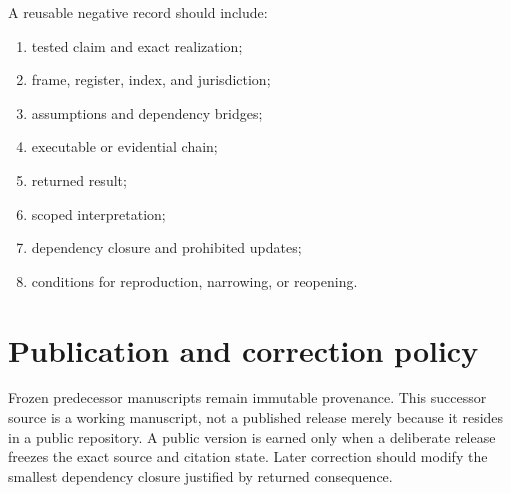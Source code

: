 A reusable negative record should include:
\begin{enumerate}
\item tested claim and exact realization;
\item frame, register, index, and jurisdiction;
\item assumptions and dependency bridges;
\item executable or evidential chain;
\item returned result;
\item scoped interpretation;
\item dependency closure and prohibited updates;
\item conditions for reproduction, narrowing, or reopening.
\end{enumerate}

\section{Publication and correction policy}

Frozen predecessor manuscripts remain immutable provenance. This successor source is a working manuscript, not a published release merely because it resides in a public repository. A public version is earned only when a deliberate release freezes the exact source and citation state. Later correction should modify the smallest dependency closure justified by returned consequence.

\printbibliography
